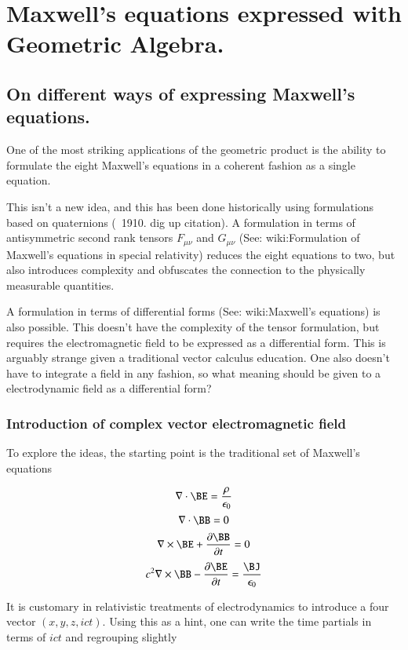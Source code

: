 \chapter{Maxwell's equations expressed with Geometric Algebra.} 

\section{On different ways of expressing Maxwell's equations.}

One of the most striking applications of the geometric product is the ability to formulate the eight Maxwell's equations in a coherent fashion as a single equation.

This isn't a new idea, and this has been done historically using formulations based on quaternions (~1910.  dig up citation).  A formulation in terms of antisymmetric second rank tensors $F_{\mu \nu}$ and $G_{\mu \nu}$ (See: wiki:Formulation of Maxwell's equations in special relativity) reduces the eight equations to two, but also introduces complexity and obfuscates the connection to the physically measurable quantities.

A formulation in terms of differential forms (See: wiki:Maxwell's equations) is also possible.  This doesn't have the complexity of the tensor formulation, but requires the electromagnetic field to be expressed as a differential form.  This is arguably strange given a traditional vector calculus education.  One also doesn't have to integrate a field in any fashion, so what meaning should be given to a electrodynamic field as a differential form?

\subsection{Introduction of complex vector electromagnetic field }

To explore the ideas, the starting point is the traditional set of Maxwell's equations

\[
\nabla \cdot \BE  = \frac {\rho} {\epsilon_0}
\]
\[
\nabla \cdot \BB  = 0
\]
\[
\nabla \times \BE  +\frac{\partial \BB } {\partial t} = 0
\]
\[
c^2 \nabla \times \BB  - \frac{\partial \BE } {\partial t}
= \frac{\BJ}{\epsilon_0}
\]

It is customary in relativistic treatments of electrodynamics to introduce a four vector $(x, y, z, ict)$.  Using this as a hint, one can write the time partials in terms of $ict$ and regrouping slightly

